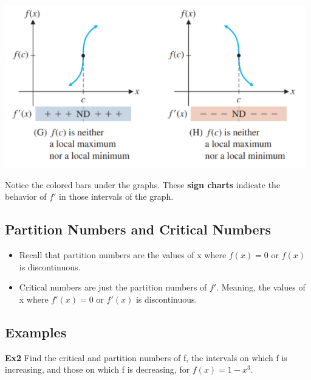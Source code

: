 \documentclass[14pt]{extarticle}
\begin{document}
\begin{center}\includegraphics[width=0.7\linewidth]{11-1-a5}\end{center}
\vspace{1em}
Notice the colored bars under the graphs. These \textbf{sign charts} indicate the behavior of $f'$ in those intervals of the graph.

\subsection{Partition Numbers and Critical Numbers}
\begin{itemize}
	\item Recall that partition numbers are the values of x where $f(x)=0$ or $f(x)$ is discontinuous.
	\item Critical numbers are just the partition numbers of $f'$. Meaning, the values of x where $f'(x)=0$ or $f'(x)$ is discontinuous.
\end{itemize}

\cleardoublepage

\subsection{Examples}
\textbf{Ex2}
Find the critical and partition numbers of f, the intervals on which f is increasing, and those on which f is decreasing, for $f(x) = 1 - x^3$.
\end{document}
